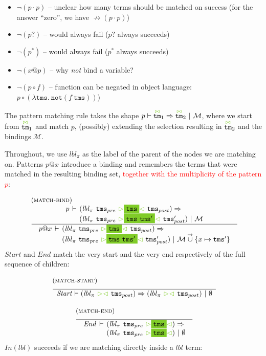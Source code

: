 \documentclass{article}
\makeatletter
\newcommand{\RED}[1]{\textcolor{red}{#1}}
\newcommand{\rulename}{\textsc}
\newcommand{\irule}[3]{\begin{array}{l}{~\small\mbox{(\rulename{#1})}}\\\;\frac{\begin{array}{c}#2\end{array}}{\begin{array}{l}#3\end{array}}\end{array}}
\newcommand{\cursorColor}{LimeGreen}
\newcommand{\lbl}{\ensuremath{\mathit{lbl}}}
\newcommand{\tm}{\ensuremath{\mathtt{tm}}}
\newcommand{\tms}{\ensuremath{\mathtt{tms}}}
\newcommand{\Tmc}{\ensuremath{\overset{ \textcolor{\cursorColor}{\bowtie}}{\tm}}}
\newcommand{\mstart}{\ensuremath{\textcolor{\cursorColor}{\rhd}}}
\newcommand{\mend}{\ensuremath{\textcolor{\cursorColor}{\lhd}}}
\newcommand{\bindings}{\ensuremath{\mathcal{M}}}
\newcommand{\nobindings}{\ensuremath{\emptyset}}
\newcommand{\extend}[2]{\ensuremath{#1\overset{\rightarrow}{\cup}#2}}
\newcommand{\select}[1]{\mstart\colorbox{\cursorColor}{$#1$}\mend}
\newcommand{\matches}[4]{\ensuremath{#1 \vdash #2 \Rightarrow #3 ~|~ #4}}
\newcommand{\xmatches}[4]{\ensuremath{
    \begin{array}{r@{\hspace{4pt}}c@{\hspace{4pt}}l}%
      #1 & \vdash & #2 \Rightarrow\\
         &        & #3 ~|~ #4
    \end{array}}}
\newcommand{\pseq}[2]{\ensuremath{#1 \cdot #2}}
\newcommand{\pnot}[1]{\ensuremath{\lnot #1}}
\newcommand{\maybe}[1]{\ensuremath{#1?}}
\newcommand{\many}[1]{\ensuremath{#1^*}}
\newcommand{\bind}[2]{\ensuremath{#1@#2}}
\newcommand{\paction}[2]{\ensuremath{#1\mathop{\circ} #2}}
\newcommand{\nfb}[1]{\ensuremath{\mathop{\not\rightarrow}(#1)}}
\newcommand{\pin}[1]{\ensuremath{\mathit{In}(#1)}}
\newcommand{\pstart}{\ensuremath{\mathit{Start}}}
\newcommand{\pend}{\ensuremath{\mathit{End}}}
\makeatother
\begin{document}
\begin{itemize}
\item $\pnot{(\pseq{p}{p})}$ -- unclear how many terms should be
  matched on success (for the answer ``zero'', we have
  $\nfb{\pseq{p}{p}}$)
\item $\pnot{(\maybe{p})}$ -- would always fail ($\maybe{p}$ always
  succeeds)
\item $\pnot{(\many{p})}$ -- would always fail ($\many{p}$ always
  succeeds)
\item $\pnot{(\bind{x}{p})}$ -- why \emph{not} bind a variable?
\item $\pnot{(\paction{p}{f})}$ -- function can be negated in
  object language:
  $\paction{p}{(\lambda \tms .~ \texttt{not} (f~\tms))}$)
\end{itemize}
%
%
%
The pattern matching rule takes the shape
$\matches{p}{\Tmc_1}{\Tmc_2}{\bindings}$, where we start from
$\Tmc_1$ and match $p$, (possibly) extending the selection
resulting in $\Tmc_2$ and the bindings $\bindings$.

Throughout, we use $\lbl_\pi$ as the label of the parent of the
nodes we are matching on.
%
Patterns $\bind{p}{x}$ introduce a binding and remembers the terms
that were matched in the resulting binding set, \RED{together with the
multiplicity of the pattern $p$}:

\[
  \begin{array}{c}
    \irule{match-bind}{
    \xmatches{p}{(\lbl_\pi~\tms_{pre}~\select{\tms}~\tms_{post})}
                {(\lbl_\pi~\tms_{pre}~\select{\tms~\tms'}~\tms'_{post})}{\bindings}
    }{
    \xmatches{\bind{p}{x}}
    {(\lbl_\pi~\tms_{pre}~\select{\tms}~\tms_{post})}
    {(\lbl_\pi~\tms_{pre}~\select{\tms~\tms'}~\tms'_{post})}{\extend{\bindings} \{x\mapsto \tms'\}}
    }
  \end{array}
\]
%
\pstart{} and \pend{} match the very start and the very end
respectively of the full sequence of children:

\[
  \begin{array}{c}
    \irule{match-start}{}{
    \matches{\pstart}
    {(\lbl_\pi~\mstart\mend~\tms_{post})}
    {(\lbl_\pi~\mstart\mend~\tms_{post})}{\nobindings}
    }
    \\\\
    \irule{match-end}{}{
    \xmatches{\pend}
    {(\lbl_\pi~\tms_{pre}~\select{\tms})}
    {(\lbl_\pi~\tms_{pre}~\select{\tms})}{\nobindings}
    }
  \end{array}
\]
%
$\pin{\lbl}$ succeeds if we are matching directly inside a $\lbl$
term:
\end{document}
